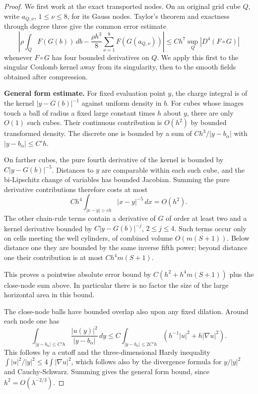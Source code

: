 \begin{proof}
We first work at the exact transported nodes. On an original grid cube
\(Q\), write \(a_{Q,\nu}\), \(1\le\nu\le8\), for its Gauss
nodes. Taylor's theorem and exactness through degree three give the
common error estimate
\[
 \left|\rho\int_Q F(G(b))\,db
   -\frac{\rho h^3}{8}\sum_{\nu=1}^8 F(G(a_{Q,\nu}))\right|
 \le C h^7\sup_Q |D^4(F\circ G)|
\]
whenever \(F\circ G\) has four bounded derivatives on \(Q\).
We apply this first to the singular Coulomb kernel away from its
singularity, then to the smooth fields obtained after compression.

\noindent\textbf{General form estimate.} For fixed evaluation point \(y\), the charge integral is of the kernel \(|y-G(b)|^{-1}\) against uniform density in \(b\). For cubes whose images touch a ball of radius a fixed large constant times \(h\) about \(y\), there are only \(O(1)\) such cubes. Their continuous contribution is \(O(h^2)\) by bounded transformed density. The discrete one is bounded by a sum of \(C h^3/|y-b_\alpha|\) with \(|y-b_\alpha|\le C'h\). 

On farther cubes, the pure fourth derivative of the kernel is bounded
by \(C|y-G(b)|^{-5}\). Distances to \(y\) are comparable within
each such cube, and the bi-Lipschitz change of variables has bounded
Jacobian. Summing the pure derivative contributions therefore costs
at most
\[
 C h^4\int_{|x-y|>ch}|x-y|^{-5}\,dx=O(h^2).
\]
The other chain-rule terms contain a derivative of \(G\) of order
at least two and a kernel derivative bounded by
\(C|y-G(b)|^{-j}\), \(2\le j\le4\). Such terms occur only on
cells meeting the well cylinders, of combined volume
\(O(m(S+1))\). Below distance one they are bounded by the same
inverse fifth power; beyond distance one their contribution is at
most \(C h^4m(S+1)\).

This proves a pointwise absolute error bound by \(C(h^2+h^4 m(S+1))\) plus the close-node sum above. In particular there is no factor the size of the large horizontal area in this bound.

The close-node balls have bounded overlap also upon any fixed dilation. Around each node one has
\[
  \int_{|y-b_\alpha|\le C'h}\frac{|u(y)|^2}{|y-b_\alpha|}\,dy
  \le C\int_{|y-b_\alpha|\le 2C'h}
                       (h^{-1}|u|^2+h|\nabla u|^2).
\]
This follows by a cutoff and the three-dimensional Hardy inequality \(\int |u|^2/|y|^2\le4\int|\nabla u|^2\), which follows also by the divergence formula for \(y/|y|^2\) and Cauchy-Schwarz. Summing gives the general form bound, since \(h^2=O(\lambda^{-2/3})\).


\end{proof}

